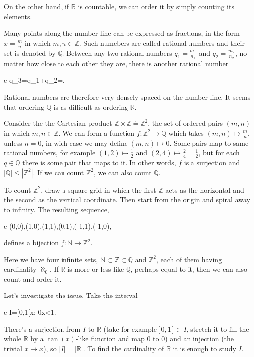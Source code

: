 \documentclass[11pt,oneside,%
]{memoir}
\newenvironment{eqna}{\begin{IEEEeqnarray}{c}}{\end{IEEEeqnarray}\ignorespacesafterend}
\theoremstyle{definition}
\newcommand{\NN}{\mathbb{N}}
\newcommand{\RR}{\mathbb{R}}
\newcommand{\ZZ}{\mathbb{Z}}
\newcommand{\QQ}{\mathbb{Q}}
\begin{document}
On the other hand, if \(\RR\) is countable, we can order it by simply counting its elements.

Many points along the number line can be expressed as fractions, in the form \(x=\frac{m}{n}\) in which \(m,n\in\ZZ\). Such numebers are called rational numbers and their set is denoted by \(\QQ\). Between any two rational numbers \(q_1=\frac{m_1}{n_1}\) and \(q_2=\frac{m_2}{n_2}\), no matter how close to each other they are, there is another rational number
\begin{eqna}
    q_3=q_1+q_2=.
\end{eqna}
Rational numbers are therefore very densely spaced on the number line. It seems that ordering \(\QQ\) is as difficult as ordering \(\RR\).

Consider the the Cartesian product \(\ZZ\times\ZZ\doteq\ZZ^2\), the set of ordered pairs \((m,n)\) in which \(m,n\in\ZZ\). We can form a function \(f:\ZZ^2\rightarrow\QQ\) which takes \((m,n)\mapsto\frac{m}{n}\), unless \(n=0\), in wich case we may define \((m,n)\mapsto 0\). Some pairs map to same rational numbers, for example \((1,2)\mapsto\frac{1}{2}\) and \((2,4)\mapsto\frac{2}{4}=\frac{1}{2}\), but for each \(q\in\QQ\) there is some pair that maps to it. In other words, \(f\) is a surjection and \(|\QQ|\leq|\ZZ^2|\). If we can count \(\ZZ^2\), we can also count \(\QQ\).

To count \(\ZZ^2\), draw a square grid in which the first \(\ZZ\) acts as the horizontal and the second as the vertical coordinate. Then start from the origin and spiral away to infinity. The resulting sequence,
\begin{eqna}
    (0,0),(1,0),(1,1),(0,1),(-1,1),(-1,0),\dotsc%
\end{eqna}
defines a bijection \(f:\NN\rightarrow\ZZ^2\).

Here we have four infinite sets, \(\NN\subset\ZZ\subset\QQ\) and \(\ZZ^2\), each of them having cardinality \(\aleph_0\). If \(\RR\) is more or less like \(\QQ\), perhaps equal to it, then we can also count and order it. %

Let's investigate the issue. Take the interval
\begin{eqna}
    I=[0,1[\;\doteq\lbrace x\in\RR : 0\leq x<1\rbrace.
\end{eqna}
There's a surjection from \(I\) to \(\RR\) (take for example \(]0,1[\,\subset I\), stretch it to fill the whole \(\RR\) by a \(\tan(x)\)-like function and map \(0\) to \(0\)) and an injection (the trivial \(x\mapsto x\)), so \(|I|=|\RR|\). To find the cardinality of \(\RR\) it is enough to study \(I\).
\end{document}
